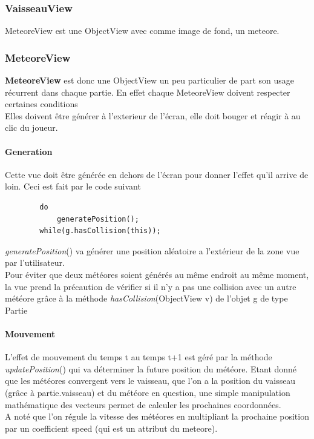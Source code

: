 \documentclass{article}
\begin{document}
\subsubsection{VaisseauView}
MeteoreView est une ObjectView avec comme image de fond, un meteore.
\subsubsection{MeteoreView}
\textbf{MeteoreView} est donc une ObjectView un peu particulier de part son usage récurrent dans chaque partie. En effet chaque MeteoreView doivent respecter certaines conditions \\
Elles doivent être générer à l'exterieur de l'écran, elle doit bouger et réagir à au clic du joueur.

\paragraph{Generation}
Cette vue doit être générée en dehors de l'écran pour donner l'effet qu'il arrive de loin. Ceci est fait par le code suivant
\begin{verbatim}
        do
            generatePosition();
        while(g.hasCollision(this));
\end{verbatim}

\textit{generatePosition}() va générer une position aléatoire a l'extérieur de la zone vue par l'utilisateur. \\
Pour éviter que deux météores soient générés au même endroit au même moment, la vue prend la précaution de vérifier si il n'y a pas une collision avec un autre météore grâce à la méthode \textit{hasCollision}(ObjectView v) de l'objet g de type Partie

\paragraph{Mouvement}
L'effet de mouvement du temps t au temps t+1 est géré par la méthode \textit{updatePosition}() qui va déterminer la future position du météore. Etant donné que les météores convergent vers le vaisseau, que l'on a la position du vaisseau (grâce à partie.vaisseau) et du météore en question, une simple manipulation mathématique des vecteurs permet de calculer les prochaines coordonnées. \\
A noté que l'on régule la vitesse des météores en multipliant la prochaine position par un coefficient speed (qui est un attribut du meteore).
\end{document}
